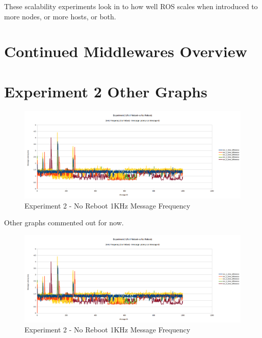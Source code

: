 \documentclass{l4proj}
\begin{document}
These scalability experiments look in to how well ROS scales when introduced to more nodes, or more hosts, or both.















\begin{appendices}

\chapter{Continued Middlewares Overview}
\label{middlewares-overview-appendix}


\chapter{Experiment 2 Other Graphs}
\label{exp2-appendix-results}

\begin{figure}
\centering
\includegraphics[width=\textwidth]{images/no-reboot-1khz.png}
\caption{Experiment 2 - No Reboot 1KHz Message Frequency}
\label{exp2-noreboot-1khz}
\end{figure}
Other graphs commented out for now.
\iffalse
\begin{figure}
\centering
\includegraphics[width=\textwidth]{images/no-reboot-1khz.png}
\caption{Experiment 2 - No Reboot 1KHz Message Frequency}
\label{exp2-fullreboot-1khz}
\end{figure}


\end{appendices}
\end{document}
